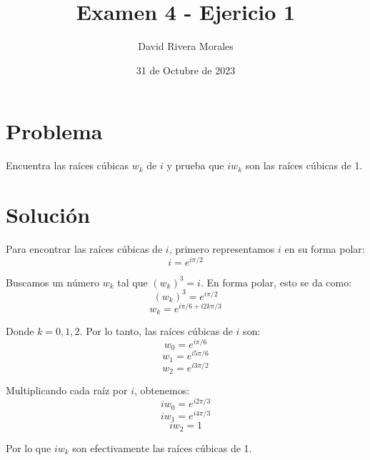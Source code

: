 \documentclass[12pt]{article}
\title{Examen 4 - Ejericio 1}
\author{David Rivera Morales}
\date{31 de Octubre de 2023}
\begin{document}
\maketitle

\section*{Problema}
Encuentra las raíces cúbicas \(w_k\) de \(i\) y prueba que \(iw_k\) son las raíces cúbicas de 1.

\section*{Solución}
Para encontrar las raíces cúbicas de \(i\), primero representamos \(i\) en su forma polar:
\[ i = e^{i \pi/2} \]

Buscamos un número \(w_k\) tal que \( (w_k)^3 = i \). En forma polar, esto se da como:
\[ (w_k)^3 = e^{i \pi/2} \]
\[ w_k = e^{i \pi/6 + i 2k\pi/3} \]

Donde \( k = 0, 1, 2 \). Por lo tanto, las raíces cúbicas de \(i\) son:
\[ w_0 = e^{i \pi/6} \]
\[ w_1 = e^{i 5\pi/6} \]
\[ w_2 = e^{i 3\pi/2} \]

Multiplicando cada raíz por \(i\), obtenemos:
\[ iw_0 = e^{i 2\pi/3} \]
\[ iw_1 = e^{i 4\pi/3} \]
\[ iw_2 = 1 \]

Por lo que \(iw_k\) son efectivamente las raíces cúbicas de 1.
\end{document}
